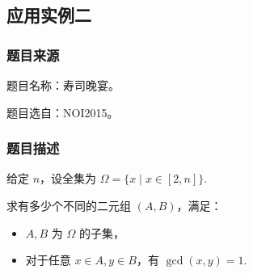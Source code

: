\begin{Shaded}
\begin{Highlighting}[]
\OperatorTok{[}\OperatorTok{][}\OperatorTok{+}\OperatorTok{(}\OperatorTok{)][}\OperatorTok{]+=}\OperatorTok{[}\OperatorTok{{-}}\OperatorTok{][}\OperatorTok{][}\OperatorTok{];}
                        \OperatorTok{\}}
                    \OperatorTok{\}}
                \OperatorTok{\}}
            \OperatorTok{\}}
        \OperatorTok{\}}
    \OperatorTok{\}}
     \OperatorTok{=}\OperatorTok{;}
    \OperatorTok{(}\OperatorTok{=}\OperatorTok{;}\OperatorTok{\textless{}(}\OperatorTok{\textless{}\textless{}}\OperatorTok{);}\OperatorTok{++)}\OperatorTok{+=}\OperatorTok{[}\OperatorTok{][}\OperatorTok{][}\OperatorTok{];}
\OperatorTok{\textless{}\textless{}}\OperatorTok{\textless{}\textless{}}\OperatorTok{;}
     \OperatorTok{;}
\OperatorTok{\}}
\end{Highlighting}
\end{Shaded}

\subsection{应用实例二}

\subsubsection{题目来源}

题目名称：寿司晚宴。

题目选自：NOI2015。

\subsubsection{题目描述}

给定 \(n\)，设全集为 \(\Omega=\{x\mid x\in[2,n]\}\).

求有多少个不同的二元组 \((A,B)\)，满足：

\begin{itemize}
\tightlist
\item
  \(A,B\) 为 \(\Omega\) 的子集，
\item
  对于任意 \(x\in A,y\in B\)，有 \(\gcd(x,y)=1\).
\end{itemize}

